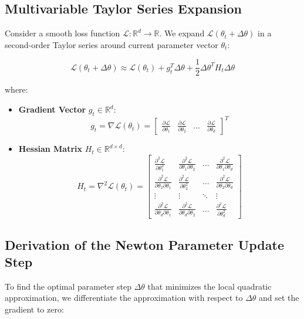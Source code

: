 \subsection{Multivariable Taylor Series Expansion}
Consider a smooth loss function $\mathcal{L}: \mathbb{R}^d \to \mathbb{R}$. We expand $\mathcal{L}(\theta_t + \Delta \theta)$ in a second-order Taylor series around current parameter vector $\theta_t$:

\begin{equation}
\mathcal{L}(\theta_t + \Delta \theta) \approx \mathcal{L}(\theta_t) + g_t^T \Delta \theta + \frac{1}{2} \Delta \theta^T H_t \Delta \theta
\end{equation}

where:
\begin{itemize}[leftmargin=*]
    \item \textbf{Gradient Vector} $g_t \in \mathbb{R}^d$:
    \begin{equation}
    g_t = \nabla \mathcal{L}(\theta_t) = \begin{bmatrix} \frac{\partial \mathcal{L}}{\partial \theta_1} & \frac{\partial \mathcal{L}}{\partial \theta_2} & \dots & \frac{\partial \mathcal{L}}{\partial \theta_d} \end{bmatrix}^T
    \end{equation}
    \item \textbf{Hessian Matrix} $H_t \in \mathbb{R}^{d \times d}$:
    \begin{equation}
    H_t = \nabla^2 \mathcal{L}(\theta_t) = \begin{bmatrix}
    \frac{\partial^2 \mathcal{L}}{\partial \theta_1^2} & \frac{\partial^2 \mathcal{L}}{\partial \theta_1 \partial \theta_2} & \dots & \frac{\partial^2 \mathcal{L}}{\partial \theta_1 \partial \theta_d} \\
    \frac{\partial^2 \mathcal{L}}{\partial \theta_2 \partial \theta_1} & \frac{\partial^2 \mathcal{L}}{\partial \theta_2^2} & \dots & \frac{\partial^2 \mathcal{L}}{\partial \theta_2 \partial \theta_d} \\
    \vdots & \vdots & \ddots & \vdots \\
    \frac{\partial^2 \mathcal{L}}{\partial \theta_d \partial \theta_1} & \frac{\partial^2 \mathcal{L}}{\partial \theta_d \partial \theta_2} & \dots & \frac{\partial^2 \mathcal{L}}{\partial \theta_d^2}
    \end{bmatrix}
    \end{equation}
\end{itemize}

\subsection{Derivation of the Newton Parameter Update Step}
To find the optimal parameter step $\Delta \theta$ that minimizes the local quadratic approximation, we differentiate the approximation with respect to $\Delta \theta$ and set the gradient to zero:

